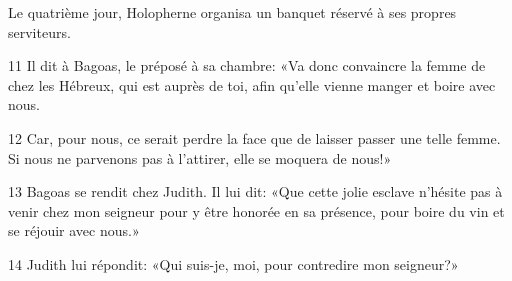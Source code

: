 Le quatrième jour, Holopherne organisa un banquet réservé à ses propres serviteurs. 

11 Il dit à Bagoas, le préposé à sa chambre: «Va donc convaincre la femme de chez les Hébreux, qui est auprès de toi, afin qu'elle vienne manger et boire avec nous.

12 Car, pour nous, ce serait perdre la face que de laisser passer une telle femme. Si nous ne parvenons pas à l'attirer, elle se moquera de nous!»

13 Bagoas se rendit chez Judith. Il lui dit: «Que cette jolie esclave n'hésite pas à venir chez mon seigneur pour y être honorée en sa présence, pour boire du vin et se réjouir avec nous.»

14 Judith lui répondit: «Qui suis-je, moi, pour contredire mon seigneur?»